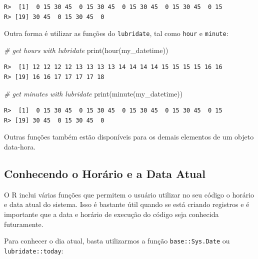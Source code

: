\documentclass[
  11pt,
]{book}
\newenvironment{Shaded}{\begin{snugshade}}{\end{snugshade}}
\newcommand{\CommentTok}[1]{\textcolor[rgb]{0.37,0.37,0.37}{\textit{#1}}}
\newcommand{\FunctionTok}[1]{\textcolor[rgb]{0,0,0}{#1}}
\newcommand{\NormalTok}[1]{#1}
\begin{document}
\begin{verbatim}
R>  [1]  0 15 30 45  0 15 30 45  0 15 30 45  0 15 30 45  0 15
R> [19] 30 45  0 15 30 45  0
\end{verbatim}

Outra forma é utilizar as funções do \texttt{lubridate}, tal como \texttt{hour} e \texttt{minute}: 

\begin{Shaded}
\begin{Highlighting}[]
\CommentTok{\# get hours with lubridate}
\FunctionTok{print}\NormalTok{(}\FunctionTok{hour}\NormalTok{(my\_datetime))}
\end{Highlighting}
\end{Shaded}

\begin{verbatim}
R>  [1] 12 12 12 12 13 13 13 13 14 14 14 14 15 15 15 15 16 16
R> [19] 16 16 17 17 17 17 18
\end{verbatim}

\begin{Shaded}
\begin{Highlighting}[]
\CommentTok{\# get minutes with lubridate}
\FunctionTok{print}\NormalTok{(}\FunctionTok{minute}\NormalTok{(my\_datetime))}
\end{Highlighting}
\end{Shaded}

\begin{verbatim}
R>  [1]  0 15 30 45  0 15 30 45  0 15 30 45  0 15 30 45  0 15
R> [19] 30 45  0 15 30 45  0
\end{verbatim}

Outras funções também estão disponíveis para os demais elementos de um objeto data-hora.

\hypertarget{conhecendo-o-horuxe1rio-e-a-data-atual}{%
\subsection{Conhecendo o Horário e a Data Atual}\label{conhecendo-o-horuxe1rio-e-a-data-atual}}

O R inclui várias funções que permitem o usuário utilizar no seu código o horário e data atual do sistema. Isso é bastante útil quando se está criando registros e é importante que a data e horário de execução do código seja conhecida futuramente.

Para conhecer o dia atual, basta utilizarmos a função \texttt{base::Sys.Date} ou \texttt{lubridate::today}:  
\end{document}

